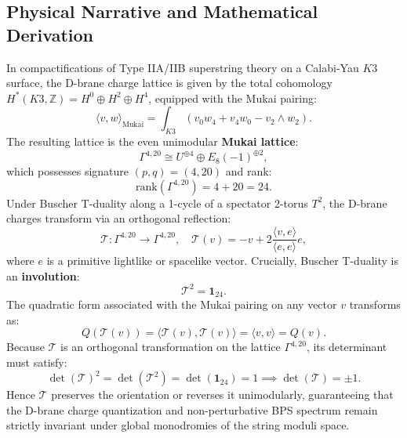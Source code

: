 \documentclass[11pt,a4paper]{article}
\begin{document}
\subsection{Physical Narrative and Mathematical Derivation}
In compactifications of Type IIA/IIB superstring theory on a Calabi-Yau $K3$ surface, the D-brane charge lattice is given by the total cohomology $H^*(K3, \mathbb{Z}) = H^0 \oplus H^2 \oplus H^4$, equipped with the Mukai pairing:
\begin{equation}
    \langle v, w \rangle_{\mathrm{Mukai}} = \int_{K3} (v_0 w_4 + v_4 w_0 - v_2 \wedge w_2).
\end{equation}
The resulting lattice is the even unimodular \textbf{Mukai lattice}:
\begin{equation}
    \Gamma^{4,20} \cong U^{\oplus 4} \oplus E_8(-1)^{\oplus 2},
\end{equation}
which possesses signature $(p, q) = (4, 20)$ and rank:
\begin{equation}
    \mathrm{rank}(\Gamma^{4,20}) = 4 + 20 = 24.
\end{equation}
Under Buscher T-duality along a 1-cycle of a spectator 2-torus $T^2$, the D-brane charges transform via an orthogonal reflection:
\begin{equation}
    \mathcal{T} : \Gamma^{4,20} \to \Gamma^{4,20}, \quad \mathcal{T}(v) = -v + 2 \frac{\langle v, e \rangle}{\langle e, e \rangle} e,
\end{equation}
where $e$ is a primitive lightlike or spacelike vector. Crucially, Buscher T-duality is an \textbf{involution}:
\begin{equation}
    \mathcal{T}^2 = \mathbf{1}_{24}.
\end{equation}
The quadratic form associated with the Mukai pairing on any vector $v$ transforms as:
\begin{equation}
    Q(\mathcal{T}(v)) = \langle \mathcal{T}(v), \mathcal{T}(v) \rangle = \langle v, v \rangle = Q(v).
\end{equation}
Because $\mathcal{T}$ is an orthogonal transformation on the lattice $\Gamma^{4,20}$, its determinant must satisfy:
\begin{equation}
    \det(\mathcal{T})^2 = \det(\mathcal{T}^2) = \det(\mathbf{1}_{24}) = 1 \implies \det(\mathcal{T}) = \pm 1.
\end{equation}
Hence $\mathcal{T}$ preserves the orientation or reverses it unimodularly, guaranteeing that the D-brane charge quantization and non-perturbative BPS spectrum remain strictly invariant under global monodromies of the string moduli space.
\end{document}
